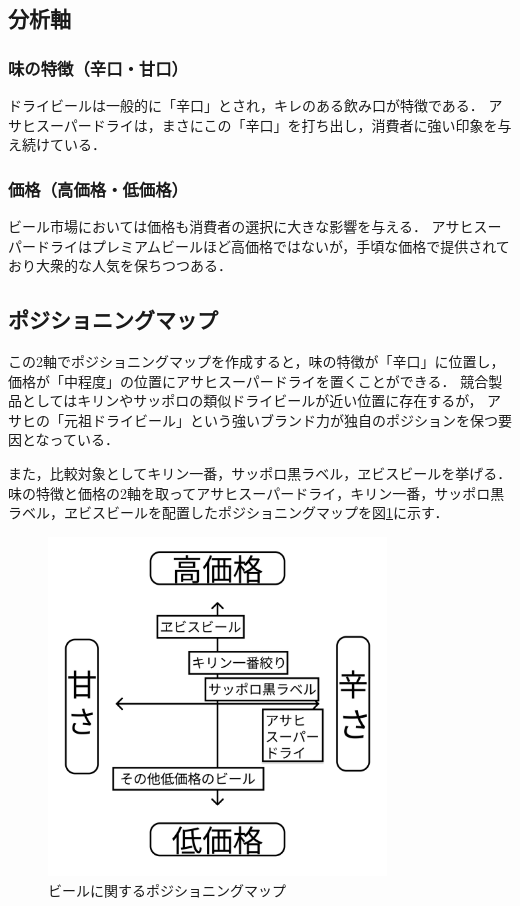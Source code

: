 \documentclass[titlepage,a4paper]{jsarticle}
\begin{document}
\subsection{分析軸}
\subsubsection{味の特徴（辛口・甘口）}
ドライビールは一般的に「辛口」とされ，キレのある飲み口が特徴である．
アサヒスーパードライは，まさにこの「辛口」を打ち出し，消費者に強い印象を与え続けている．

\subsubsection{価格（高価格・低価格）}
ビール市場においては価格も消費者の選択に大きな影響を与える．
アサヒスーパードライはプレミアムビールほど高価格ではないが，手頃な価格で提供されており大衆的な人気を保ちつつある．

\subsection{ポジショニングマップ}
この2軸でポジショニングマップを作成すると，味の特徴が「辛口」に位置し，価格が「中程度」の位置にアサヒスーパードライを置くことができる．
競合製品としてはキリンやサッポロの類似ドライビールが近い位置に存在するが，
アサヒの「元祖ドライビール」という強いブランド力が独自のポジションを保つ要因となっている．

また，比較対象としてキリン一番，サッポロ黒ラベル，ヱビスビールを挙げる．
味の特徴と価格の2軸を取ってアサヒスーパードライ，キリン一番，サッポロ黒ラベル，ヱビスビールを配置したポジショニングマップを図\ref{map}に示す．
\begin{figure}[H]
  \centering
  \includegraphics[width=0.8\textwidth]{img/pMap2.png}
  \caption{ビールに関するポジショニングマップ}
  \label{map}
\end{figure}
\end{document}
